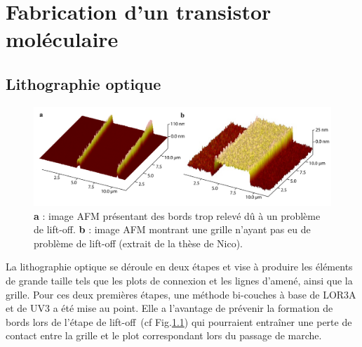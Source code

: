 \chapter{Fabrication d'un transistor moléculaire}

\section{Lithographie optique}


\begin{figure}
\centering \includegraphics[scale=0.45]{Fabrication/BatmanGrille/BatmanGrille.pdf}
\caption{\textbf{a} : image AFM présentant des bords trop relevé d\^u à un problème de lift-off. \textbf{b} : image AFM montrant une grille n'ayant pas eu de problème de lift-off (extrait de la thèse de Nico).}
\label{lift-off}
\end{figure}


La lithographie optique se déroule en deux étapes et vise à produire les éléments de grande taille tels que les plots de connexion et les lignes d'amené, ainsi que la grille. Pour ces deux premières étapes, une méthode bi-couches à base de LOR3A et de UV3 a été mise au point. Elle a l'avantage de prévenir la formation de bords lors de l'étape de lift-off~(cf Fig.\ref{lift-off}) qui pourraient entraîner une perte de contact entre la grille et le plot correspondant lors du passage de marche.




